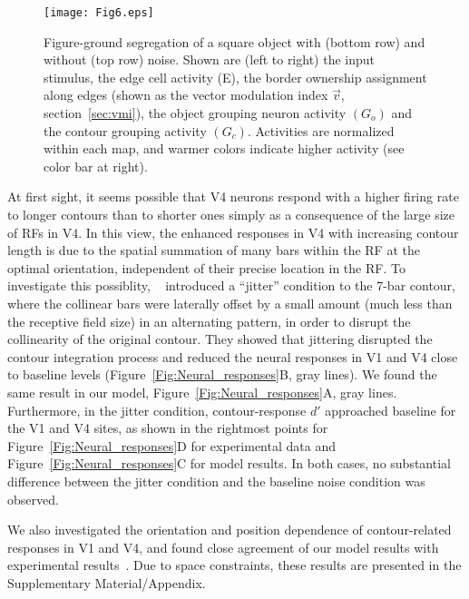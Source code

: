 \begin{figure*}
\begin{center}
\texttt{[image: Fig6.eps]}
\end{center}
\caption{Figure-ground segregation of a square object with (bottom
  row) and without (top row) noise. Shown are (left to right) the input
  stimulus, the edge cell activity (E), the border ownership
  assignment along edges (shown as the vector modulation index $\vec{v}$,
  section~\ref{sec:vmi}), the object grouping 
  neuron activity 
$(G_o)$
 and the contour grouping activity
$(G_c)$.
 Activities are normalized within each map, and warmer colors
  indicate higher activity (see color bar at right).}
\label{Fig:Square}
\end{figure*}

At first sight, it seems possible that 
V4 neurons respond with a higher firing rate to longer contours than
to shorter ones simply as a consequence of 
the large size of RFs in V4. 
In this view, the enhanced responses in V4 with increasing contour
length is due to the spatial summation of many bars
within the RF at the optimal orientation,
independent of their precise location in the RF. 
To  investigate this possiblity,
~\cite{Chen_etal14} introduced a ``jitter'' condition to the 7-bar
contour, where the collinear bars were laterally offset 
by a small amount (much less than the receptive field size)
in an alternating pattern, in order to disrupt the collinearity of the original contour. They showed that jittering disrupted the
contour integration process and reduced the neural responses in V1
and V4 close to baseline levels (Figure~\ref{Fig:Neural_responses}B,
gray lines). We found the same result in our model,
Figure~\ref{Fig:Neural_responses}A, gray lines.  Furthermore, in the
jitter condition, contour-response $d'$ approached baseline for the
V1 and V4 sites, as shown in the rightmost points for
Figure~\ref{Fig:Neural_responses}D for experimental data and
Figure~\ref{Fig:Neural_responses}C for model results. In both cases,
no substantial difference between the jitter condition and the
baseline noise condition was observed.

We also investigated the orientation and position dependence of contour-related responses in V1 and V4, and found close agreement of our model results with experimental results~\citep{Chen_etal14}. Due to space constraints, these results are presented in the Supplementary Material/Appendix. %

